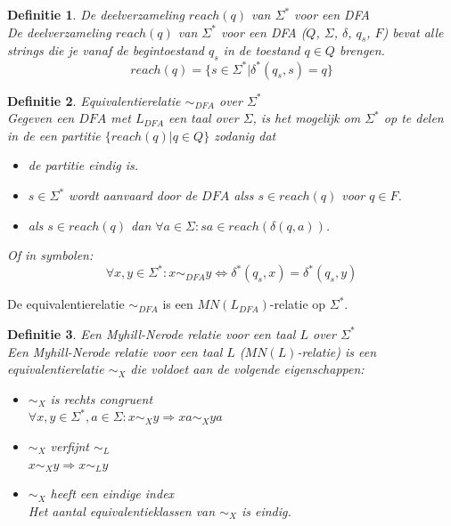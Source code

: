 \documentclass[a4paper]{article}
\newtheorem{tdefinitie}{Definitie}[section]
\newenvironment{definitie}[1]%
  {\begin{mdframed}[backgroundcolor=silver,
    topline=false,
    rightline=false,
    leftline=false,
    bottomline=false]\begin{tdefinitie}#1\\\normalfont}%
  {\end{tdefinitie}\end{mdframed}}
\newcommand{\sstar}{\ensuremath{\Sigma^*}}
\begin{document}
\begin{definitie}{De deelverzameling $reach(q)$ van $\sstar$ voor een DFA}
  De deelverzameling $reach(q)$ van $\sstar$ voor een DFA ($Q$, $\Sigma$, $\delta$, $q_s$, $F$) bevat alle strings die je vanaf de begintoestand $q_s$ in de toestand $q \in Q$ brengen.
  \begin{equation*}
  reach(q) = \{s \in \sstar|\delta^*(q_s,s)=q\}
  \end{equation*}
\end{definitie}

\begin{definitie}{Equivalentierelatie $\sim_{DFA}$ over $\sstar$}
  Gegeven een $DFA$ met $L_{DFA}$ een taal over $\Sigma$, is het mogelijk om $\sstar$ op te delen in de een partitie $\{reach(q)|q \in Q\}$ zodanig dat
  \begin{itemize}
  \item de partitie eindig is.
  \item $s \in \sstar$ wordt aanvaard door de $DFA$ alss $s \in reach(q)$ voor $q \in F$.
  \item als $s \in reach(q)$ dan $\forall a \in \Sigma : sa \in reach(\delta(q, a))$.
  \end{itemize}
  Of in symbolen:
  \begin{equation*}
  \forall x, y \in \sstar: x \sim_{DFA} y \Leftrightarrow \delta^*(q_s, x) = \delta^*(q_s, y)
  \end{equation*}
\end{definitie}

De equivalentierelatie $\sim_{DFA}$ is een $MN(L_{DFA})$-relatie op $\sstar$.

\begin{definitie}{Een Myhill-Nerode relatie voor een taal $L$ over $\sstar$}
  \label{def:mnl}
  Een Myhill-Nerode relatie voor een taal $L$ ($MN(L)$-relatie) is een equivalentierelatie $\sim_X$ die voldoet aan de volgende eigenschappen:
  \begin{itemize}
  \item $\sim_X$ is rechts congruent\\$\forall x, y \in \sstar, a \in \Sigma: x \sim_X y \Rightarrow xa \sim_X ya$
  \item $\sim_X$ verfijnt $\sim_L$\\$x \sim_X y \Rightarrow x \sim_L y$
  \item $\sim_X$ heeft een eindige index\\Het aantal equivalentieklassen van $\sim_X$ is eindig.
  \end{itemize}
\end{definitie}
\end{document}

